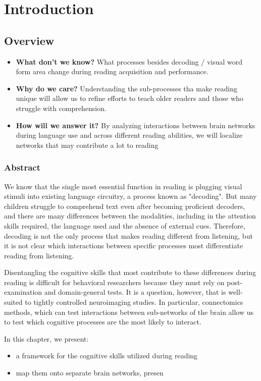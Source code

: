 \chapter{Introduction}

\section{Overview}
\begin{itemize}
	\item \textbf{What don't we know?} What processes besides decoding / visual word form area change during reading acquisition and performance.
	\item \textbf{Why do we care?} Understanding the sub-processes tha make reading unique will allow us to refine efforts to teach older readers and those who struggle with comprehension.
	\item \textbf{How will we answer it?} By analyzing interactions between brain networks during language use and across different reading abilities, we will localize networks that may contribute a lot to reading 
\end{itemize}

\subsection{Abstract}

We know that the single most essential function in reading is plugging visual stimuli into existing language circuitry, a process known as "decoding". But many children struggle to comprehend text even after becoming proficient decoders, and there are many differences between the modalities, including in the attention skills required, the language used and the absence of external cues. Therefore, decoding is not the only process that makes reading different from listening, but it is not clear which interactions between specific processes most differentiate reading from listening. 

Disentangling the cognitive skills that most contribute to these differences during reading is difficult for behavioral researchers because they must rely on post-examination and domain-general tests. It is a question, however, that is well-suited to tightly controlled neuroimaging studies. In particular, connectomics methods, which can test interactions between sub-networks of the brain allow us to test which cognitive processes are the most likely to interact. 

In this chapter, we present:
\begin{itemize}
	\item a framework for the cognitive skills utilized during reading
	\item map them onto separate brain networks, presen
\end{itemize}

